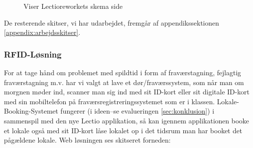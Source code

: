         \begin{figure}[H]
            \centering
            \caption{Viser Lectioreworkets skema side}
        \end{figure}

        De resterende skitser, vi har udarbejdet, fremgår af appendikssektionen \ref{appendix:arbejdsskitser}.

        \subsubsection{RFID-Løsning}
        For at tage hånd om problemet med spildtid i form af fraværstagning, fejlagtig fraværstagning m.v. har vi valgt at lave et dør/fraværssystem, som når man om morgnen møder ind, scanner man sig ind med sit ID-kort eller sit
        digitale ID-kort med sin mobiltelefon på fraværsregistreringssystemet som er i klassen.  
        Lokale-Booking-Systemet fungerer (i ideen--se evalueringen \ref{sec:konklusion}) i sammenspil med den nye Lectio applikation, så kan igennem applikationen booke et lokale også med sit ID-kort
        låse lokalet op i det tidsrum man har booket det pågældene lokale. Web løsningen ses skitseret forneden:

